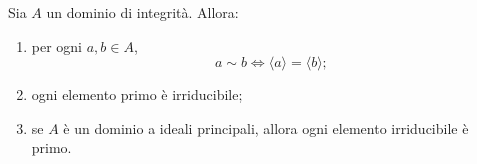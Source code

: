 \documentclass[a4paper]{article}
\begin{document}
\begin{radioactive}
\begin{snippetproposition}{}
    Sia \(A\) un dominio di integrità. Allora:

    \begin{enumerate}
        \item per ogni \(a,b\in A\),
        \[
            a\sim b
            \iff
            \langle a \rangle=\langle b \rangle;
        \]

        \item ogni elemento primo è irriducibile;

        \item se \(A\) è un dominio a ideali principali, allora ogni elemento irriducibile è primo.
    \end{enumerate}
\end{snippetproposition}
\end{radioactive}
\end{document}
